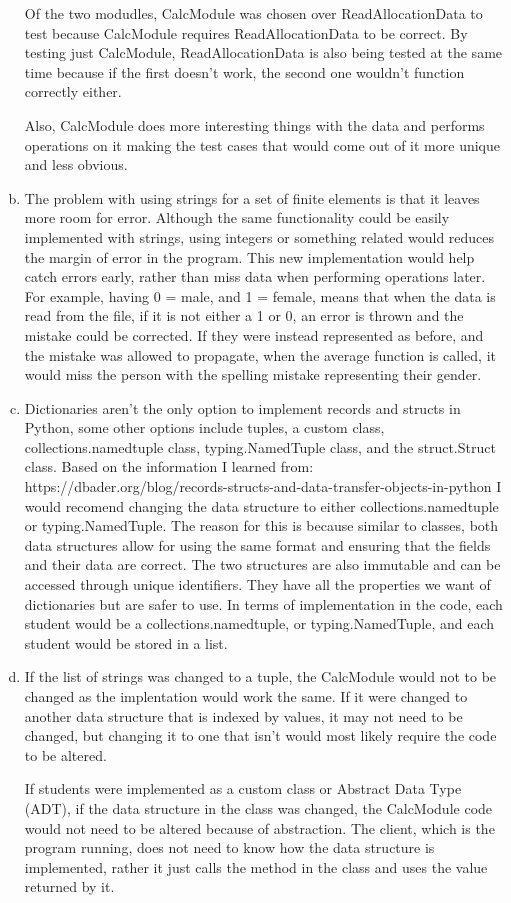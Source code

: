 \documentclass[12pt]{article}
\begin{document}
\begin{enumerate}[(a)]
Of the two modudles, CalcModule was chosen over ReadAllocationData to test because
CalcModule requires ReadAllocationData to be correct. By testing just CalcModule,
ReadAllocationData is also being tested at the same time because if the first doesn't
work, the second one wouldn't function correctly either.

Also, CalcModule does more interesting things with the data and performs operations on it
making the test cases that would come out of it more unique and less obvious.

\item The problem with using strings for a set of finite elements is that it leaves
more room for error. Although the same functionality could be easily implemented with
strings, using integers or something related would reduces the margin of error in the
program. This new implementation would help catch errors early, rather than miss data
when performing operations later. For example, having 0 = male, and 1 = female, means
that when the data is read from the file, if it is not either a 1 or 0, an error is 
thrown and the mistake could be corrected. If they were instead represented as before,
and the mistake was allowed to propagate, when the average function is called, it would
miss the person with the spelling mistake representing their gender.

\item Dictionaries aren't the only option to implement records and structs in Python,
some other options include tuples, a custom class, collections.namedtuple class, 
typing.NamedTuple class, and the struct.Struct class. Based on the information I learned
from: https://dbader.org/blog/records-structs-and-data-transfer-objects-in-python
I would recomend changing the data structure to either collections.namedtuple or
typing.NamedTuple. The reason for this is because similar to classes, both data
structures allow for using the same format and ensuring that the fields and their 
data are correct. The two structures are also immutable and can be accessed through
unique identifiers. They have all the properties we want of dictionaries but are
safer to use. In terms of implementation in the code, each student would be a
collections.namedtuple, or typing.NamedTuple, and each student would be stored 
in a list.

\item If the list of strings was changed to a tuple, the CalcModule would not to be
changed as the implentation would work the same. If it were changed to another data structure
that is indexed by values, it may not need to be changed, but changing it to one that isn't
would most likely require the code to be altered.

If students were implemented as a custom class or Abstract Data Type (ADT), if the data
structure in the class was changed, the CalcModule code would not need to be altered
because of abstraction. The client, which is the program running, does not need to know
how the data structure is implemented, rather it just calls the method in the class and
uses the value returned by it.

\end{enumerate}
\end{document}
